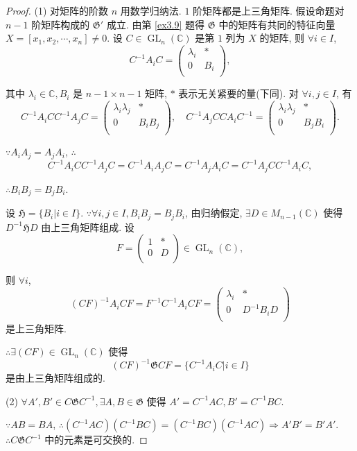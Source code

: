 \documentclass{ctexart}
\begin{document}
\begin{proof}
    (1) 对矩阵的阶数 $n$ 用数学归纳法. $1$ 阶矩阵都是上三角矩阵. 假设命题对 $n-1$ 阶矩阵构成的 $\mathfrak{G}'$ 成立. 由第 \ref{ex3.9} 题得 $\mathfrak{G}$ 中的矩阵有共同的特征向量 $X=[x_1,x_2,\cdots,x_n]\neq0$. 设 $C\in\operatorname{GL}_n(\mathbb{C})$ 是第 $1$ 列为 $X$ 的矩阵, 则 $\forall i\in I$,
    \[C^{-1}A_iC=\begin{pmatrix}
        \lambda_i & * \\
        0 & B_i \\
    \end{pmatrix},\]

    其中 $\lambda_i\in\mathbb{C},B_i$ 是 $n-1\times n-1$ 矩阵, $*$ 表示无关紧要的量(下同). 对 $\forall i,j\in I$, 有
    \[C^{-1}A_iCC^{-1}A_jC=\begin{pmatrix}
        \lambda_i\lambda_j & * \\
        0 & B_iB_j \\
    \end{pmatrix},\quad C^{-1}A_jCCA_iC^{-1}=\begin{pmatrix}
        \lambda_i\lambda_j & * \\
        0 & B_jB_i \\
    \end{pmatrix}.\]

    $\because A_iA_j=A_jA_i$, $\therefore$
    \[C^{-1}A_iCC^{-1}A_jC=C^{-1}A_iA_jC=C^{-1}A_jA_iC=C^{-1}A_jCC^{-1}A_iC,\]

    $\therefore B_iB_j=B_jB_i$.

    设 $\mathfrak{H}=\{B_i|i\in I\}$. $\because\forall i,j\in I,B_iB_j=B_jB_i$, 由归纳假定, $\exists D\in M_{n-1}(\mathbb{C})$ 使得 $D^{-1}\mathfrak{H}D$ 由上三角矩阵组成. 设
    \[F=\begin{pmatrix}
        1 & * \\
        0 & D \\
    \end{pmatrix}\in\operatorname{GL}_n(\mathbb{C}),\]

    则 $\forall i$,
    \[(CF)^{-1}A_iCF=F^{-1}C^{-1}A_iCF=\begin{pmatrix}
        \lambda_i & * \\
        0 & D^{-1}B_iD \\
    \end{pmatrix}\]
    是上三角矩阵.

    $\therefore\exists(CF)\in\operatorname{GL}_n(\mathbb{C})$ 使得
    \[(CF)^{-1}\mathfrak{G}CF=\{C^{-1}A_iC|i\in I\}\]
    是由上三角矩阵组成的.

    (2) $\forall A',B'\in C\mathfrak{G}C^{-1},\exists A,B\in\mathfrak{G}$ 使得 $A'=C^{-1}AC,B'=C^{-1}BC$.
    
    $\because AB=BA$, $\therefore(C^{-1}AC)(C^{-1}BC)=(C^{-1}BC)(C^{-1}AC)\Rightarrow A'B'=B'A'$. $\therefore C\mathfrak{G}C^{-1}$ 中的元素是可交换的.
\end{proof}
\end{document}
